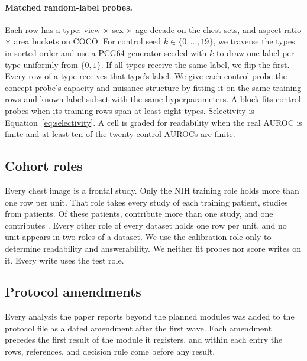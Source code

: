 \documentclass[11pt]{article}
\begin{document}
\paragraph{Matched random-label probes.} Each row has a type: view $\times$ sex $\times$ age decade on the chest sets, and aspect-ratio $\times$ area buckets on COCO. For control seed $k\in\{0,\dots,19\}$, we traverse the types in sorted order and use a PCG64 generator seeded with $k$ to draw one label per type uniformly from $\{0,1\}$. If all types receive the same label, we flip the first. Every row of a type receives that type's label. We give each control probe the concept probe's capacity and nuisance structure by fitting it on the same training rows and known-label subset with the same hyperparameters. A block fits control probes when its training rows span at least eight types. Selectivity is Equation~\ref{eq:selectivity}. A cell is graded for readability when the real AUROC is finite and at least ten of the twenty control AUROCs are finite.

\subsection{Cohort roles}
\label{app:repro-cohorts}

Every chest image is a frontal study. Only the NIH training role holds more than one row per unit. That role takes every study of each training patient, \cfCohortNihTrainRows{} studies from \cfCohortNihTrainUnits{} patients. Of these patients, \cfCohortNihTrainMulti{} contribute more than one study, and one contributes \cfCohortNihTrainMax{}. Every other role of every dataset holds one row per unit, and no unit appears in two roles of a dataset. We use the calibration role only to determine readability and answerability. We neither fit probes nor score writes on it. Every write uses the test role.

\FloatBarrier

\subsection{Protocol amendments}
\label{app:repro-protocol}

Every analysis the paper reports beyond the \cfCoveragePlannedWord{} planned modules was added to the protocol file as a dated amendment after the first wave. Each amendment precedes the first result of the module it registers, and within each entry the rows, references, and decision rule come before any result.
\end{document}

